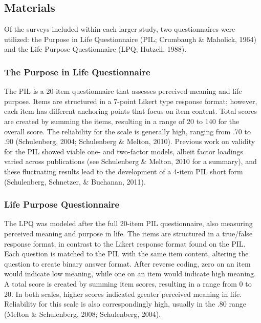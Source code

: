 \documentclass[english,man, mask]{apa6}
\theoremstyle{definition}
\theoremstyle{definition}
\theoremstyle{definition}
\theoremstyle{remark}
\begin{document}
\subsection{Materials}\label{materials}

Of the surveys included within each larger study, two questionnaires
were utilized: the Purpose in Life Questionnaire (PIL; Crumbaugh \&
Maholick, 1964) and the Life Purpose Questionnaire (LPQ; Hutzell, 1988).

\subsubsection{The Purpose in Life
Questionnaire}\label{the-purpose-in-life-questionnaire}

The PIL is a 20-item questionnaire that assesses perceived meaning and
life purpose. Items are structured in a 7-point Likert type response
format; however, each item has different anchoring points that focus on
item content. Total scores are created by summing the items, resulting
in a range of 20 to 140 for the overall score. The reliability for the
scale is generally high, ranging from .70 to .90 (Schulenberg, 2004;
Schulenberg \& Melton, 2010). Previous work on validity for the PIL
showed viable one- and two-factor models, albeit factor loadings varied
across publications (see Schulenberg \& Melton, 2010 for a summary), and
these fluctuating results lead to the development of a 4-item PIL short
form (Schulenberg, Schnetzer, \& Buchanan, 2011).

\subsubsection{Life Purpose
Questionnaire}\label{life-purpose-questionnaire}

The LPQ was modeled after the full 20-item PIL questionnaire, also
measuring perceived meaning and purpose in life. The items are
structured in a true/false response format, in contrast to the Likert
response format found on the PIL. Each question is matched to the PIL
with the same item content, altering the question to create binary
answer format. After reverse coding, zero on an item would indicate low
meaning, while one on an item would indicate high meaning. A total score
is created by summing item scores, resulting in a range from 0 to 20. In
both scales, higher scores indicated greater perceived meaning in life.
Reliability for this scale is also correspondingly high, usually in the
.80 range (Melton \& Schulenberg, 2008; Schulenberg, 2004).
\end{document}
